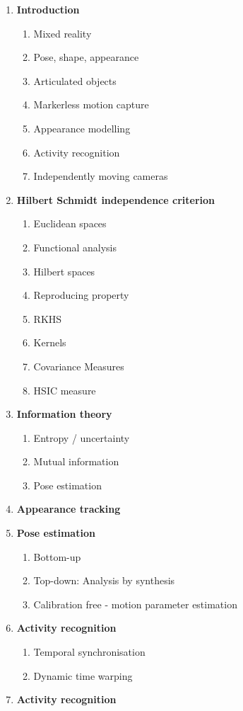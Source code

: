\begin{enumerate}
\item{\textbf{Introduction}}
  \begin{enumerate}
    \item{Mixed reality}
        \item{Pose, shape, appearance}
        \item{Articulated objects}
        \item{Markerless motion capture}
        \item{Appearance modelling}
        \item{Activity recognition}
        \item{Independently moving cameras}
          \end{enumerate}
\item{\textbf{Hilbert Schmidt independence criterion}}
  \begin{enumerate}
    \item{Euclidean spaces}
        \item{Functional analysis}
        \item{Hilbert spaces}
        \item{Reproducing property}
        \item{RKHS}
        \item{Kernels}
          \item{Covariance Measures}
        \item{HSIC measure}
          \end{enumerate}
\item{\textbf{Information theory}}
  \begin{enumerate}
    \item{Entropy / uncertainty}
        \item{Mutual information}
        \item{Pose estimation}
          \end{enumerate}
\item{\textbf{Appearance tracking}}
\item{\textbf{Pose estimation}}
  \begin{enumerate}
    \item{Bottom-up}
        \item{Top-down: Analysis by synthesis}
        \item{Calibration free - motion parameter estimation}
          \end{enumerate}
\item{\textbf{Activity recognition}}
  \begin{enumerate}
    \item{Temporal synchronisation}
      \item{Dynamic time warping}
        \end{enumerate}
\item{\textbf{Activity recognition}}
\end{enumerate}